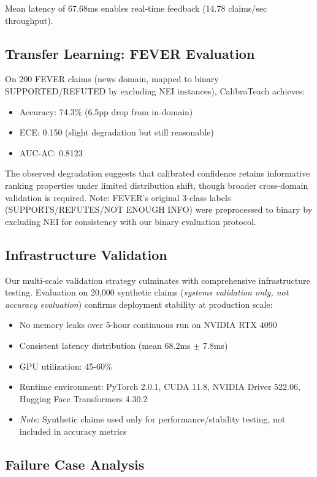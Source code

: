 \documentclass[journal]{IEEEtran}
\begin{document}
Mean latency of 67.68ms enables real-time feedback (14.78 claims/sec throughput).

\subsection{Transfer Learning: FEVER Evaluation}

On 200 FEVER claims (news domain, mapped to binary SUPPORTED/REFUTED by excluding NEI instances), CalibraTeach achieves:
\begin{itemize}
    \item Accuracy: 74.3\% (6.5pp drop from in-domain)
    \item ECE: 0.150 (slight degradation but still reasonable)
    \item AUC-AC: 0.8123
\end{itemize}

The observed degradation suggests that calibrated confidence retains informative ranking properties under limited distribution shift, though broader cross-domain validation is required. Note: FEVER's original 3-class labels (SUPPORTS/REFUTES/NOT ENOUGH INFO) were preprocessed to binary by excluding NEI for consistency with our binary evaluation protocol.

\subsection{Infrastructure Validation}

Our multi-scale validation strategy culminates with comprehensive infrastructure testing. Evaluation on 20,000 synthetic claims (\textit{systems validation only, not accuracy evaluation}) confirms deployment stability at production scale:
\begin{itemize}
    \item No memory leaks over 5-hour continuous run on NVIDIA RTX 4090
    \item Consistent latency distribution (mean 68.2ms $\pm$ 7.8ms)
    \item GPU utilization: 45-60\%
    \item Runtime environment: PyTorch 2.0.1, CUDA 11.8, NVIDIA Driver 522.06, Hugging Face Transformers 4.30.2
    \item \textit{Note}: Synthetic claims used only for performance/stability testing, not included in accuracy metrics
\end{itemize}

\subsection{Failure Case Analysis}
\end{document}
